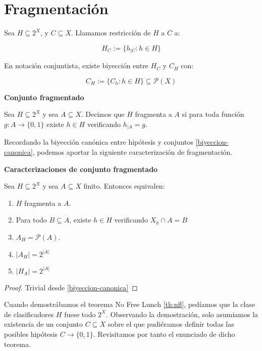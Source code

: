 \section{Fragmentación}

\begin{definition}
Sea $H\subseteq 2^X$, y $C \subseteq X$. Llamamos restricción de $H$ a $C$ a:

\[H_{C} := \{h_{|C} : h\in H\}\]

En notación conjuntista, existe biyección entre $H_C$ y $C_{H}$ con:

\[C_{H} := \{C_h : h\in H\} \subseteq \mathcal{P}(X)\]
\end{definition}


\begin{definition} \textbf{Conjunto fragmentado}

 Sea $H\subseteq 2^X$ y sea $A\subseteq X$. Decimos que $H$ fragmenta a $A$ si para toda función $g:A\rightarrow \{0,1\}$ 
 existe $h\in H$ verificando $h_{|A} = g$.
\end{definition}

Recordando la biyección canónica entre hipótesis y conjuntos \ref{biyeccion-canonica}, podemos aportar la siguiente 
caracterización de fragmentación.

\begin{fact} \textbf{Caracterizaciones de conjunto fragmentado}

 Sea $H\subseteq 2^X$ y sea $A\subseteq X$ finito. Entonces equivalen:
 
 \begin{enumerate}[i]
  \item $H$ fragmenta a $A$.
  \item Para todo $B\subseteq A$, existe $h\in H$ verificando $X_h \cap A = B$
  \item $A_H = \mathcal{P}(A)$.
  \item $|A_H| = 2^{|A|}$
  \item $|H_A| = 2^{|A|}$
 \end{enumerate}
\end{fact}

  \begin{proof}
  Trivial desde \ref{biyeccion-canonica}
  \end{proof}


Cuando demostrábamos el teorema No Free Lunch \ref{th:nfl}, pedíamos que la clase de clasificadores $H$ fuese todo $2^X$. 
Observando la demostración, solo asumiamos la existencia de un conjunto $C\subseteq X$ sobre el que pudiéramos definir 
todas las posibles hipótesis $C \rightarrow \{0,1\}$. Revisitamos por tanto el enunciado de dicho teorema.

